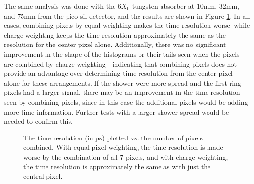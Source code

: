 \documentclass[twocolumn,aps,prd,reprint]{revtex4-1}
\begin{document}
The same analysis was done with the 6$X_0$ tungsten absorber at 10mm, 32mm, and 75mm from the pico-sil detector, and the results are shown in Figure \ref{resolution charge equal}. In all cases, combining pixels by equal weighting makes the time resolution worse, while charge weighting keeps the time resolution approximately the same as the resolution for the center pixel alone. Additionally, there was no significant improvement in the shape of the histograms or their tails seen when the pixels are combined by charge weighting - indicating that combining pixels does not provide an advantage over determining time resolution from the center pixel alone for these arrangements. If the shower were more spread and the first ring pixels had a larger signal, there may be an improvement in the time resolution seen by combining pixels, since in this case the additional pixels would be adding more time information. Further tests with a larger shower spread would be needed to confirm this.

\begin{figure}[!htbp]
\centering
{} 
\caption{The time resolution (in ps) plotted vs. the number of pixels combined. With equal pixel weighting, the time resolution is made worse by the combination of all 7 pixels, and with charge weighting, the time resolution is approximately the same as with just the central pixel.}
\label{resolution charge equal}
\end{figure}
\end{document}
